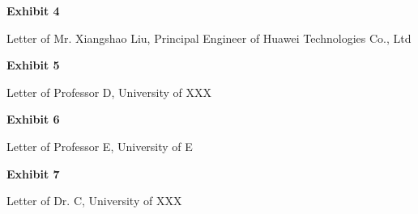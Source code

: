 \documentclass{article}
\begin{document}


\vspace*{\fill}
\begin{center}

{\LARGE \bf
Exhibit 4
}

\vspace{10\baselineskip}

{\large Letter of Mr. Xiangshao Liu, Principal Engineer of Huawei Technologies Co., Ltd}

\end{center}
\vspace*{\fill}


% 



\vspace*{\fill}
\begin{center}

{\LARGE \bf
Exhibit 5
}

\vspace{10\baselineskip}

{\large  Letter of Professor D, University of XXX}

\end{center}
\vspace*{\fill}


% 




\vspace*{\fill}
\begin{center}

{\LARGE \bf
Exhibit 6
}

\vspace{10\baselineskip}

{\large Letter of Professor E, University of E}

\end{center}
\vspace*{\fill}

% 




\vspace*{\fill}
\begin{center}

{\LARGE \bf
Exhibit 7
}

\vspace{10\baselineskip}

{\large Letter of Dr. C, University of XXX}

\end{center}
\vspace*{\fill}
\end{document}
